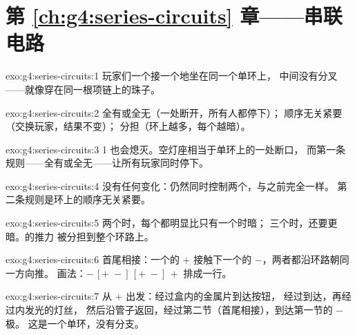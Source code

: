 \section*{第 \ref{ch:g4:series-circuits} 章——串联电路}

\begin{solution}{exo:g4:series-circuits:1}
玩家们一个接一个地坐在同一个单环上，
中间没有分叉——就像穿在同一根项链上的珠子。
\end{solution}

\begin{solution}{exo:g4:series-circuits:2}
全有或全无（一处断开，所有人都停下）；
顺序无关紧要（交换玩家，结果不变）；
分担（环上越多，每个越暗）。
\end{solution}

\begin{solution}{exo:g4:series-circuits:3}
 1 也会熄灭。空灯座相当于单环上的一处断口，
而第一条规则——全有或全无——让所有玩家同时停下。
\end{solution}

\begin{solution}{exo:g4:series-circuits:4}
没有任何变化：仍然同时控制两个，与之前完全一样。
第二条规则是环上的顺序无关紧要。
\end{solution}

\begin{solution}{exo:g4:series-circuits:5}
两个时，每个都明显比只有一个时暗；
三个时，还要更暗。的推力
被分担到整个环路上。
\end{solution}

\begin{solution}{exo:g4:series-circuits:6}
首尾相接：一个的 $+$ 接触下一个的 $-$，两者都沿环路朝同一方向推。
画法：$-\,[{+}\;{-}]\,[{+}\;
{-}]\,+$ 排成一行。
\end{solution}

\begin{solution}{exo:g4:series-circuits:7}
从 $+$ 出发：经过盒内的金属片到达按钮，
经过到达，再经过内发光的灯丝，
然后沿管子返回，经过第二节（首尾相接），到达第一节的 $-$ 极。
这是一个单环，没有分支。
\end{solution}

